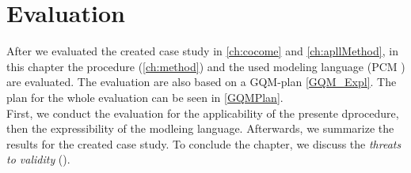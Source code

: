 \chapter{Evaluation}
\label{ch:eval}
After we evaluated the created case study in \autoref{ch:cocome} and \autoref{ch:apllMethod}, in this chapter the procedure (\autoref{ch:method}) and the used modeling language (PCM \cite{PCM}) are evaluated. The evaluation are also based on a GQM-plan \autoref{GQM_Expl}. The plan for the whole evaluation can be seen in \autoref{GQMPlan}. \\ First, we conduct the evaluation for the applicability of the presente dprocedure, then the expressibility of the modleing language. Afterwards, we summarize the results for the created case study. To conclude the chapter, we discuss the \textit{threats to validity} (\cite{TtoV}).

